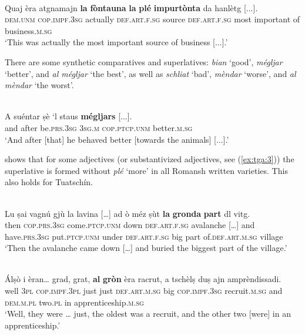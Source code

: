 \ea
\label{}
\\
\gll Quaj èra atgnamajn \textbf{la} \textbf{fòntauna} \textbf{la} \textbf{plé} \textbf{impurtònta} da hanlètg [...].\\
\textsc{dem.unm} \textsc{cop.impf.3sg} actually  \textsc{def.art.f.sg} source \textsc{def.art.f.sg} most important of business.\textsc{m.sg}\\
\glt `This was actually the most important source of  business [...].'
\z

There are some synthetic comparatives and superlatives: \textit{bian} `good', \textit{mégljar} `better', and  \textit{al mégljar} `the best', as well as \textit{schliat} `bad', \textit{mèndar} `worse', and \textit{al mèndar} `the worst'.

\ea
\label{}
\\
\gll A suéntar ṣè `l staus \textbf{mégljars} [...].\\
and after be\textsc{.prs.3sg} \textsc{3sg.m} \textsc{cop.ptcp.unm} better.\textsc{m.sg}\\
\glt`And after [that] he behaved better [towards the animals] [...].'
\z


\citet[233-50]{Linder1987} shows that for some adjectives (or substantivized adjectives, see (\ref{ex:tga:3})) the superlative is formed without \textit{plé} `more' in all Romansh written varieties. This also holds for Tuatschín.

\ea
\label{}
\\
\gll    Lu ṣai vagnú gjù la lavina […] ad ò méz ṣùt \textbf{la} \textbf{gronda} \textbf{part} dl vitg.\\
then \textsc{cop.prs.3sg} come.\textsc{ptcp.unm} down \textsc{def.art.f.sg} avalanche […] and have.\textsc{prs.3sg} put.\textsc{ptcp.unm} under \textsc{def.art.f.sg} big part of.\textsc{def.art.m.sg} village\\
\glt `Then the avalanche came down […] and buried the biggest part of the village.'
\z

\ea\label{ex:tga:3}
\\
\gll   Álṣò i èran… grad, grat, \textbf{al} \textbf{gròn} èra racrut, a tschèlṣ duṣ ajn amprèndissadi. \\
well \textsc{3pl} \textsc{cop.impf.3pl} just just \textsc{def.art.m.sg} big \textsc{cop.impf.3sg} recruit.\textsc{m.sg} and  \textsc{dem.m.pl} two.\textsc{pl} in apprenticeship.\textsc{m.sg} \\
\glt `Well, they were … just, the oldest was a recruit, and the other two [were] in an apprenticeship.'\\
\z

